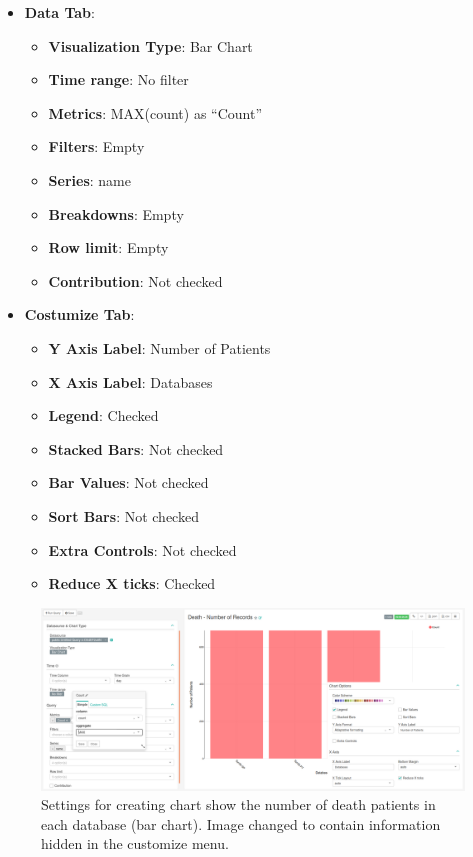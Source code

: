 \documentclass[]{book}
\providecommand{\tightlist}{%
  \setlength{\itemsep}{0pt}\setlength{\parskip}{0pt}}
\begin{document}
\begin{itemize}
\tightlist
\item
  \textbf{Data Tab}:

  \begin{itemize}
  \tightlist
  \item
    \textbf{Visualization Type}: Bar Chart
  \item
    \textbf{Time range}: No filter
  \item
    \textbf{Metrics}: MAX(count) as ``Count''
  \item
    \textbf{Filters}: Empty
  \item
    \textbf{Series}: name
  \item
    \textbf{Breakdowns}: Empty
  \item
    \textbf{Row limit}: Empty
  \item
    \textbf{Contribution}: Not checked
  \end{itemize}
\item
  \textbf{Costumize Tab}:

  \begin{itemize}
  \tightlist
  \item
    \textbf{Y Axis Label}: Number of Patients
  \item
    \textbf{X Axis Label}: Databases
  \item
    \textbf{Legend}: Checked
  \item
    \textbf{Stacked Bars}: Not checked
  \item
    \textbf{Bar Values}: Not checked
  \item
    \textbf{Sort Bars}: Not checked
  \item
    \textbf{Extra Controls}: Not checked
  \item
    \textbf{Reduce X ticks}: Checked
  \end{itemize}
\end{itemize}

\begin{figure}
\includegraphics[width=1\linewidth]{images/deathNumberOfRecords} \caption{Settings for creating chart show the number of death patients in each database (bar chart). Image changed to contain information hidden in the customize menu.}\label{fig:deathNumberOfRecords}
\end{figure}
\end{document}
